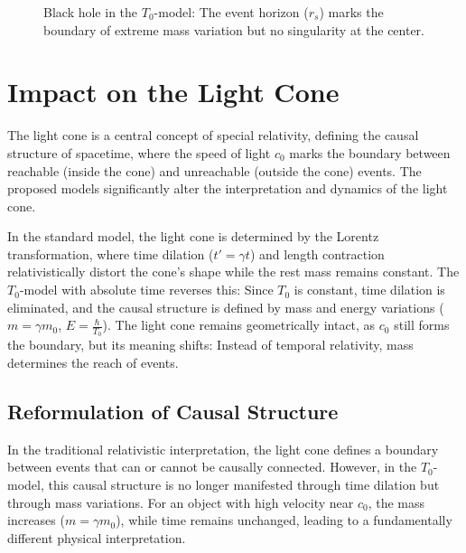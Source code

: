 \documentclass[a4paper,12pt]{article}
\begin{document}
	\begin{figure}[h]
		\centering
		\caption{Black hole in the $T_0$-model: The event horizon ($r_s$) marks the boundary of extreme mass variation but no singularity at the center.}
	\end{figure}
	
	\section{Impact on the Light Cone}
	The light cone is a central concept of special relativity, defining the causal structure of spacetime, where the speed of light \( c_0 \) marks the boundary between reachable (inside the cone) and unreachable (outside the cone) events. The proposed models significantly alter the interpretation and dynamics of the light cone.
	
	In the standard model, the light cone is determined by the Lorentz transformation, where time dilation (\( t' = \gamma t \)) and length contraction relativistically distort the cone's shape while the rest mass remains constant. The \( T_0 \)-model with absolute time reverses this: Since \( T_0 \) is constant, time dilation is eliminated, and the causal structure is defined by mass and energy variations (\( m = \gamma m_0 \), \( E = \frac{\hbar}{T_0} \)). The light cone remains geometrically intact, as \( c_0 \) still forms the boundary, but its meaning shifts: Instead of temporal relativity, mass determines the reach of events.
	
	\subsection{Reformulation of Causal Structure}
	In the traditional relativistic interpretation, the light cone defines a boundary between events that can or cannot be causally connected. However, in the \( T_0 \)-model, this causal structure is no longer manifested through time dilation but through mass variations. For an object with high velocity near \( c_0 \), the mass increases (\( m = \gamma m_0 \)), while time remains unchanged, leading to a fundamentally different physical interpretation.
	
\end{document}
